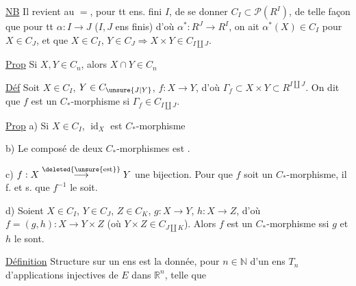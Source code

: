 \uline{NB} Il revient au $=$, pour tt ens. fini $I$, de se donner  $C_I\subset\mathcal P(R^I)$, de telle façon que pour tt $\alpha:I\to J$ ($I,J$ ens finis) d'où $\alpha^*:R^J\to R^I$, on ait $\alpha^*(X)\in C_I$ pour $X\in C_J$, et que $X\in C_I$, $Y\in C_J\Rightarrow X\times Y\in C_{I\amalg J}$.

\uline{Prop} Si $X,Y\in C_n$, alors $X\cap Y\in C_n$

\uline{Déf} Soit $X\in C_I$, $Y\in C_{\unsure{J|Y}}$, $f:X\to Y$, d'où $\Gamma_f\subset X\times Y\subset R^{I\amalg J}$. On dit que $f$ est un $C_*$-morphisme si $\Gamma_f\in C_{I\amalg J}$.


\uline{Prop} a) Si $X\in C_I$, $\operatorname{id}_X$ est $C_*$-morphisme

b) Le composé de deux $C_*$-morphismes est .

c)  $f:X\overset{\deleted{\unsure{\text{est}}}}{\longrightarrow}Y$ une bijection. Pour que $f$ soit un $C_*$-morphisme, il f. et s. que $f^{-1}$ le soit.

d) Soient $X\in C_I$, $Y\in C_J$, $Z\in C_K$, $g:X\to Y$, $h:X\to Z$, d'où $f=(g,h):X\to Y\times Z$  (où $Y\times Z\in C_{J\amalg K}$).
Alors $f$ est un $C_*$-morphisme ssi $g$ et $h$ le sont.



\uline{Définition}  Structure  sur un ens  est la donnée, pour  $n\in\mathbb N$ d'un ens $T_n$ d'applications injectives de $E$ dans $\mathbb R^n$, telle que

